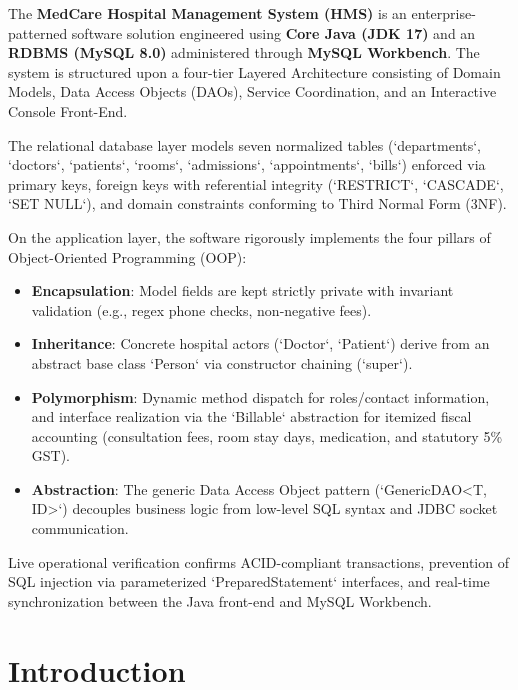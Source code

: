 \documentclass[12pt,a4paper]{article}
\begin{document}
The \textbf{MedCare Hospital Management System (HMS)} is an enterprise-patterned software solution engineered using \textbf{Core Java (JDK 17)} and an \textbf{RDBMS (MySQL 8.0)} administered through \textbf{MySQL Workbench}. The system is structured upon a four-tier Layered Architecture consisting of Domain Models, Data Access Objects (DAOs), Service Coordination, and an Interactive Console Front-End. 

The relational database layer models seven normalized tables (`departments`, `doctors`, `patients`, `rooms`, `admissions`, `appointments`, `bills`) enforced via primary keys, foreign keys with referential integrity (`RESTRICT`, `CASCADE`, `SET NULL`), and domain constraints conforming to Third Normal Form (3NF). 

On the application layer, the software rigorously implements the four pillars of Object-Oriented Programming (OOP):
\begin{itemize}[noitemsep]
    \item \textbf{Encapsulation}: Model fields are kept strictly private with invariant validation (e.g., regex phone checks, non-negative fees).
    \item \textbf{Inheritance}: Concrete hospital actors (`Doctor`, `Patient`) derive from an abstract base class `Person` via constructor chaining (`super`).
    \item \textbf{Polymorphism}: Dynamic method dispatch for roles/contact information, and interface realization via the `Billable` abstraction for itemized fiscal accounting (consultation fees, room stay days, medication, and statutory 5\% GST).
    \item \textbf{Abstraction}: The generic Data Access Object pattern (`GenericDAO<T, ID>`) decouples business logic from low-level SQL syntax and JDBC socket communication.
\end{itemize}

Live operational verification confirms ACID-compliant transactions, prevention of SQL injection via parameterized `PreparedStatement` interfaces, and real-time synchronization between the Java front-end and MySQL Workbench.

\section{Introduction}
\label{sec:intro}
\end{document}
